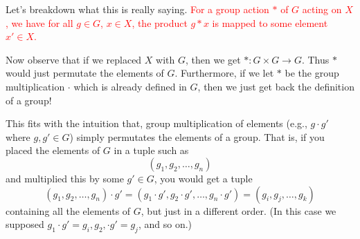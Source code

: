     Let's breakdown what this is really saying.
    \textcolor{red}{For a group
    action $*$ of $G$ acting on $X$, we have for all $g \in G$, $x \in
    X$, the product $g * x$ is mapped to some element $x' \in X$.}

    Now observe that if
    we replaced $X$ with $G$, then we get $* : G \times G \to G$.
    Thus $*$ would just permutate the elements of $G$.
    Furthermore, if we let $*$ be the group multiplication $\cdot$ which
    is already defined in $G$, then we just get back the definition of
    a group! 
    
    \textcolor{NavyBlue}{This fits with the intuition that,
    group multiplication of elements (e.g., $g \cdot g'$ where $g, g'
    \in G$) simply permutates the elements of a group. That is, if 
    you placed the elements of $G$ in a tuple such as 
    \[
        (g_1, g_2, \dots, g_n)
    \] 
    and multiplied this by some $g' \in G$, you would get a tuple 
    \[
        (g_1, g_2, \dots, g_n) \cdot g' 
        = (g_1\cdot g', g_2 \cdot g' , \dots, g_n\cdot g')
        =
        (g_i, g_j, \dots, g_k)
    \]
    containing all the elements of $G$, but just in a different order.
    (In this case we supposed $g_1 \cdot g' = g_i, g_2, \cdot g' =
    g_j$, and so on.)
    } 

